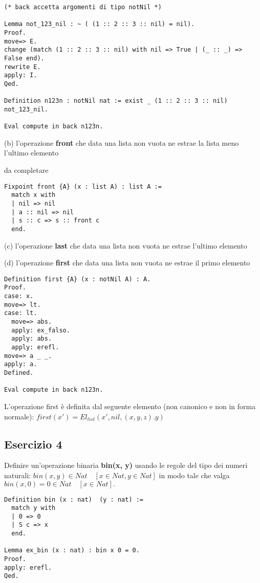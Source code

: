\begin{lstlisting}[language=Coq]
(* back accetta argomenti di tipo notNil *)

Lemma not_123_nil : ~ ( (1 :: 2 :: 3 :: nil) = nil).
Proof.
move=> E.
change (match (1 :: 2 :: 3 :: nil) with nil => True | (_ :: _) => False end).
rewrite E.
apply: I.
Qed.

Definition n123n : notNil nat := exist _ (1 :: 2 :: 3 :: nil) not_123_nil.

Eval compute in back n123n.
\end{lstlisting}

(b) l'operazione \textbf{front} che data una lista non vuota ne estrae la lista meno
l'ultimo elemento

da completare

\begin{lstlisting}[language=Coq]
Fixpoint front {A} (x : list A) : list A :=
  match x with
  | nil => nil
  | a :: nil => nil
  | s :: c => s :: front c
  end.
\end{lstlisting}

(c) l'operazione \textbf{last} che data una lista non vuota ne estrae l'ultimo elemento

(d) l'operazione \textbf{first} che data una lista non vuota ne estrae il primo
elemento

\begin{lstlisting}[language=Coq]
Definition first {A} (x : notNil A) : A.
Proof.
case: x.
move=> lt.
case: lt.
  move=> abs.
  apply: ex_falso.
  apply: abs.
  apply: erefl.
move=> a _ _.
apply: a.
Defined.

Eval compute in back n123n.
\end{lstlisting}

L'operazione first è definita dal seguente elemento (non canonico e non in
forma normale): $first(x') = El_{list}(x',nil,(x,y,z).y)$

\subsection{Esercizio 4}

Definire un'operazione binaria \textbf{bin(x, y)} usando le regole del tipo dei numeri
naturali: $bin(x, y) \in Nat \quad [x \in Nat, y \in Nat]$
in modo tale che valga $bin(x, 0) = 0 \in Nat \quad [x \in Nat].$

\begin{lstlisting}[language=Coq]
Definition bin (x : nat)  (y : nat) :=
  match y with
  | 0 => 0
  | S c => x
  end.

Lemma ex_bin (x : nat) : bin x 0 = 0.
Proof.
apply: erefl.
Qed.
\end{lstlisting}

